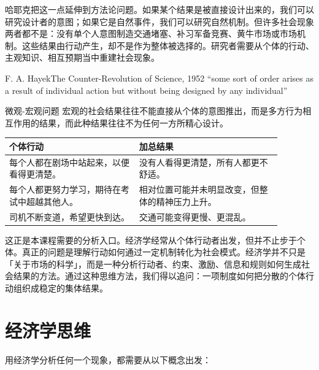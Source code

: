 \documentclass[UTF8,10pt,a4paper,scheme=chinese,fontset=none]{ctexart}
\begin{document}
哈耶克把这一点延伸到方法论问题。如果某个结果是被直接设计出来的，我们可以研究设计者的意图；如果它是自然事件，我们可以研究自然机制。但许多社会现象两者都不是：没有单个人意图制造交通堵塞、补习军备竞赛、黄牛市场或市场机制。这些结果由行动产生，却不是作为整体被选择的。研究者需要从个体的行动、主观知识、相互预期当中重建社会现象。

\begin{quotebox}{F. A. Hayek}{The Counter-Revolution of Science, 1952}
``some sort of order arises as a result of individual action but without being designed by any individual''
\end{quotebox}

\begin{conceptbox}{微观-宏观问题}
宏观的社会结果往往不能直接从个体的意图推出，而是多方行为相互作用的结果，而此种结果往往不为任何一方所精心设计。

\begin{center}
\small
\begin{tabular}{p{0.42\linewidth}p{0.46\linewidth}}
\hline
\textbf{个体行动} & \textbf{加总结果} \tabularnewline
\hline
每个人都在剧场中站起来，以便看得更清楚。 & 没有人看得更清楚，所有人都更不舒适。 \tabularnewline
每个人都更努力学习，期待在考试中超越其他人。 & 相对位置可能并未明显改变，但整体的精神压力上升。 \tabularnewline
司机不断变道，希望更快到达。 & 交通可能变得更慢、更混乱。 \tabularnewline
\hline
\end{tabular}
\end{center}
\end{conceptbox}

这正是本课程需要的分析入口。经济学经常从个体行动者出发，但并不止步于个体。真正的问题是理解行动如何通过一定机制转化为社会模式。经济学并不只是「关于市场的科学」，而是一种分析行动者、约束、激励、信息和规则如何生成社会结果的方法。通过这种思维方法，我们得以追问：一项制度如何把分散的个体行动组织成稳定的集体结果。

\section{经济学思维}

用经济学分析任何一个现象，都需要从以下概念出发：
\end{document}
